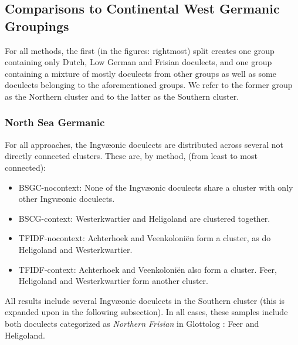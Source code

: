 \documentclass[a4paper]{article}
\begin{document}
\subsection{Comparisons to Continental West Germanic Groupings}

For all methods, the first (in the figures: rightmost) split
creates one group containing only Dutch, Low German and Frisian doculects,
and one group containing a mixture of mostly doculects from other groups
as well as some doculects belonging to the aforementioned groups.
We refer to the former group as the Northern cluster and to the
latter as the Southern cluster.

\FloatBarrier

\subsubsection{North Sea Germanic}

For all approaches, the Ingv\ae{}onic doculects
are distributed across several not directly connected clusters.
These are, by method, (from least to most connected):

\begin{itemize}
\item
BSGC-nocontext:
None of the Ingv\ae{}onic doculects share a cluster
with only other Ingv\ae{}onic doculects.

\item
BSCG-context:
Westerkwartier and Heligoland are clustered together.

\item
TFIDF-nocontext:
Achterhoek and Veenkoloni\"{e}n form a cluster,
as do Heligoland and Westerkwartier.

\item
TFIDF-context:
Achterhoek and Veenkoloni\"{e}n also form a cluster.
Feer, Heligoland and Westerkwartier form another cluster.
\end{itemize}

All results include several Ingv\ae{}onic doculects
in the Southern cluster (this is expanded upon in the following subsection).
In all cases, these
samples include both doculects categorized as \textit{Northern Frisian}
in Glottolog \citep{hammarstroem2018glottolog}: Feer and Heligoland.
\end{document}
